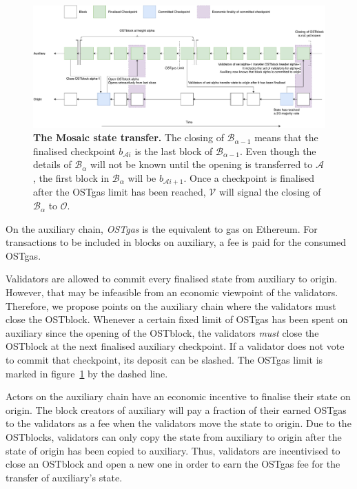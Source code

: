 \documentclass[12pt,a4paper]{article}
\newcommand{\A}{\mathcal{A}}
\newcommand{\OC}{\mathcal{O}}
\newcommand{\V}{\mathcal{V}}
\newcommand{\B}{\mathcal{B}}
\begin{document}
\begin{figure}[htb]
    \centering
	\includegraphics[width=\textwidth]{mosaic}
	\caption{
		\textbf{The Mosaic state transfer.}
		The closing of $\B_{\alpha-1}$ means that the finalised checkpoint $b_{\A{}i}$ is the last block of $\B_{\alpha-1}$.
		Even though the details of $\B_\alpha$ will not be known until the opening is transferred to $\A$,
		the first block in $\B_\alpha$ will be $b_{\A{}i+1}$.
		Once a checkpoint is finalised after the OSTgas limit has been reached,
		$\V$ will signal the closing of $\B_\alpha$ to $\OC$.
	}
	\label{fig:mosaic}
\end{figure}

On the auxiliary chain, \emph{OSTgas} is the equivalent to gas on Ethereum.
For transactions to be included in blocks on auxiliary, a fee is paid for the consumed OSTgas.

Validators are allowed to commit every finalised state from auxiliary to origin.
However, that may be infeasible from an economic viewpoint of the validators.
Therefore, we propose points on the auxiliary chain where the validators must close the OSTblock.
Whenever a certain fixed limit of OSTgas has been spent on auxiliary since the opening of the OSTblock,
the validators \emph{must} close the OSTblock at the next finalised auxiliary checkpoint.
If a validator does not vote to commit that checkpoint,
its deposit can be slashed.
The OSTgas limit is marked in figure~\ref{fig:mosaic} by the dashed line.

Actors on the auxiliary chain have an economic incentive to finalise their state on origin.
The block creators of auxiliary will pay a fraction of their earned OSTgas to the validators as a fee when the validators move the state to origin.
Due to the OSTblocks, validators can only copy the state from auxiliary to origin after the state of origin has been copied to auxiliary.
Thus, validators are incentivised to close an OSTblock and open a new one in order to earn the OSTgas fee for the transfer of auxiliary's state.
\end{document}
